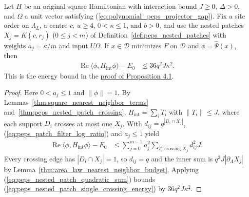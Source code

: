 \begin{lemma}
    \label{thm:peps_nested_patch_minimizer_energy}
    \leanok
    Let $H$ be an original square Hamiltonian with interaction bound $J\ge0$,
    $\Delta>0$, and $\Omega$ a unit vector satisfying (\ref{eq:polynomial_peps_projector_gap}).
    Fix a site order on $\Lambda_L$, a centre $c$, $u\ge4$,
    $0<\kappa\le1$, and $b>0$, and use the nested patches $X_j=K(c,r_j)$ ($0\le j<m$) of Definition~\ref{def:peps_nested_patches}
    with weights $a_j=\kappa/m$ and input $U\Omega$.
    If $x\in\mathcal D$ minimizes $F$ on $\mathcal D$ and $\phi=\widehat\Psi(x)$, then
    \begin{align}
        \operatorname{Re}\langle\phi,H_{\mathrm{int}}\phi\rangle-E_0
         & \le36q^2J\kappa^2.
        \label{eq:peps_nested_patch_minimizer_energy}
    \end{align}
    This is the energy bound in the
    \href{https://github.com/openai/math/blob/adc7f1241b42e322a6451854ab7e4b4c146bf78a/preprints/Polynomial-PEPS-approximation-of-gapped-square-grid-ground-states-September-24-2026/build/sections/03-patches.tex\#L213-L336}{proof of Proposition 4.1}.
\end{lemma}
\begin{proof}
    \leanok
    Here $0<a_j\le1$ and $\|\phi\|=1$. By Lemmas~\ref{thm:square_nearest_neighbor_terms} and~\ref{thm:peps_nested_patch_crossing}, $H_{\mathrm{int}}=\sum_i T_i$ with $\|T_i\|\le J$, where each support $D_i$ crosses at most one $X_j$. With $d_{ij}=q^{|D_i\cap X_j|}$, (\ref{eq:peps_patch_filter_log_ratio}) and $a_j\le1$ yield
    \begin{align}
        \operatorname{Re}\langle\phi,H_{\mathrm{int}}\phi\rangle-E_0
         & \le\sum_{j=0}^{m-1}a_j^2
        \sum_{T_i\text{ crossing }X_j}d_{ij}^2J.
        \label{eq:peps_nested_patch_single_crossing_energy}
    \end{align}
    Every crossing edge has $|D_i\cap X_j|=1$, so $d_{ij}=q$ and the inner sum is $q^2J|\partial_\Lambda X_j|$ by Lemma~\ref{thm:area_law_nearest_neighbor_budget}. Applying (\ref{eq:peps_nested_patch_quadratic_sum}) bounds (\ref{eq:peps_nested_patch_single_crossing_energy}) by $36q^2J\kappa^2$.
\end{proof}

